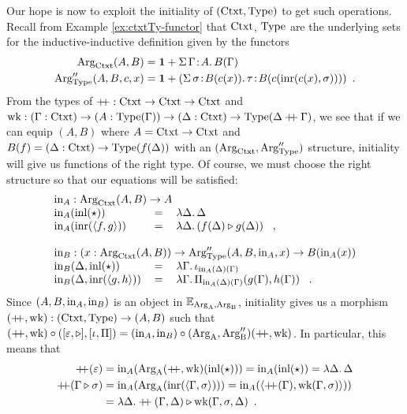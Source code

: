 \documentclass[orivec,envcountsame, ,envcountsect]{llncs}
\begin{document}
Our hope is now to exploit the initiality of $(\text{Ctxt}, \text{Type})$ to get
such operations. Recall from Example \ref{ex:ctxtTy-functor} that
$\text{Ctxt}$, $\text{Type}$ are the underlying sets for the inductive-inductive
definition given by the functors
\begin{align*}
  \text{Arg}_{\text{Ctxt}}(A, B) &= \mathbf{1} + \Sigma\, \Gamma\!:\!A .\, B(\Gamma)\\
  \text{Arg}_{\text{Type}}''(A, B, c, x) &= \mathbf{1} + (\Sigma\,  \sigma\!:\! B(c(x)).\, \tau\!:\!B(c(\text{inr}(c(x), \sigma))) ) \enspace .
\end{align*} 
From the types of $\mathbin{+\mkern-6mu+} : \text{Ctxt} \to \text{Ctxt} \to \text{Ctxt}$ and $\text{wk} :
(\Gamma : \text{Ctxt}) \to (A : \text{Type}(\Gamma)) \to (\Delta : \text{Ctxt}) \to
\text{Type}(\Delta \mathbin{+\mkern-6mu+} \Gamma)$, we see that if we can equip $(A,
B)$ where $A = \text{Ctxt} \to \text{Ctxt}$ and $B(f) = (\Delta : \text{Ctxt}) \to
\text{Type}(f(\Delta))$ with an $(\text{Arg}_{\text{Ctxt}}, \text{Arg}_{\text{Type}}'')$ structure, initiality
will give us functions of the right type. Of course, we must choose
the right structure so that our equations will be satisfied:
\[
\begin{tabular}{lcl}
  \multicolumn{3}{l}{$\inn_A : \ArgCtxt(A, B) \to A$} \\
  $\inn_A(\inl(\oneelt))$ &$=$& $\lambda \Delta .\, \Delta$ \\
  $\inn_A(\inr(\langle f , g\rangle))$ &$=$& $\lambda \Delta .\, (\consCtxt{f(\Delta)}{g(\Delta)})$ \enspace ,\\
\\
  \multicolumn{3}{l}{$\inn_B : (x : \ArgCtxt(A, B)) \to \ArgType''(A, B, \inn_A, x) \to B(\inn_A(x))$} \\
  $\inn_B(\Delta, \inl(\oneelt))$ &$=$& $\lambda \Gamma .\, \baseTy{\inn_A(\Delta)(\Gamma)}$ \\
  $\inn_B(\Delta, \inr(\langle g , h\rangle))$ &$=$& $\lambda \Gamma .\, \piTy{\inn_A(\Delta)(\Gamma)}{g(\Gamma)}{h(\Gamma)}$ \enspace .
\end{tabular}
\]
Since $(A, B, \text{in}_A, \text{in}_B)$ is an object in
$\mathbb{E}_{\text{Arg}_{\text{A}}, \text{Arg}_{\text{B}}}$, initiality gives us a morphism $(\mathbin{+\mkern-6mu+}, \text{wk}) :
(\text{Ctxt}, \text{Type}) \to (A, B)$ such that $(\mathbin{+\mkern-6mu+}, \text{wk}) \circ
([\varepsilon, \triangleright],
[\iota, \Pi]) = (\text{in}_A, \text{in}_B) \circ (\text{Arg}_{\text{A}},
\text{Arg}_{\text{B}}'')(\mathbin{+\mkern-6mu+}, \text{wk})$.  In particular, this means that
\begin{align*}
\mathbin{+\mkern-6mu+}(\varepsilon) 
 &= \text{in}_A(\text{Arg}_{\text{A}}(\mathbin{+\mkern-6mu+}, \text{wk})(\text{inl}(\star)))
  = \text{in}_A(\text{inl}(\star))
  = \lambda \Delta.\, \Delta \\
\mathbin{+\mkern-6mu+}(\Gamma \triangleright \sigma)
 &= \text{in}_A(\text{Arg}_{\text{A}}(\text{inr}(\langle\Gamma, \sigma\rangle)))
  = \text{in}_A(\langle \mathbin{+\mkern-6mu+}(\Gamma), \text{wk}(\Gamma, \sigma)\rangle)) \\
  &= \lambda \Delta . \mathbin{+\mkern-6mu+}(\Gamma, \Delta) \triangleright \text{wk}(\Gamma, \sigma, \Delta) \enspace .
\end{align*}
\end{document}
